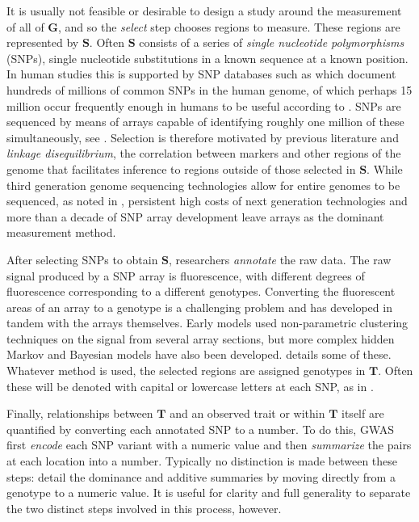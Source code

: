 \documentclass[sts]{imsart}
\newcommand{\m}[1]{\mathbf{#1}}               %
\begin{document}
It is usually not feasible or desirable to design a study around the measurement of all of $\m{G}$, and so the \emph{select} step chooses regions to measure. These regions are represented by $\m{S}$. Often $\m{S}$ consists of a series of \emph{single nucleotide polymorphisms} (SNPs), single nucleotide substitutions in a known sequence at a known position. In human studies this is supported by SNP databases such as \cite{NCBIdbSNP} which document hundreds of millions of common SNPs in the human genome, of which perhaps 15 million occur frequently enough in humans to be useful according to \cite{koboldtetal2013next}. SNPs are sequenced by means of arrays capable of identifying roughly one million of these simultaneously, see \cite{laframboise2009, tametal2019benefits}. Selection is therefore motivated by previous literature and \emph{linkage disequilibrium}, the correlation between markers and other regions of the genome that facilitates inference to regions outside of those selected in $\m{S}$. While third generation genome sequencing technologies allow for entire genomes to be sequenced, as noted in \cite{heatherchain2016sequencers, hasinetal2017multi, uffelmannetal2021gwas}, persistent high costs of next generation technologies and more than a decade of SNP array development leave arrays as the dominant measurement method.

After selecting SNPs to obtain $\m{S}$, researchers \emph{annotate} the raw data. The raw signal produced by a SNP array is fluorescence, with different degrees of fluorescence corresponding to a different genotypes. Converting the fluorescent areas of an array to a genotype is a challenging problem and has developed in tandem with the arrays themselves. Early models used non-parametric clustering techniques on the signal from several array sections, but more complex hidden Markov and Bayesian models have also been developed. \cite{laframboise2009} details some of these. Whatever method is used, the selected regions are assigned genotypes in $\m{T}$. Often these will be denoted with capital or lowercase letters at each SNP, as in \cite{siegmundyakir2007, visschergoddard2019}.

Finally, relationships between $\m{T}$ and an observed trait or within $\m{T}$ itself are quantified by converting each annotated SNP to a number. To do this, GWAS first \emph{encode} each SNP variant with a numeric value and then \emph{summarize} the pairs at each location into a number. Typically no distinction is made between these steps: \cite{LanderBotstein1989, cheverud2001, siegmundyakir2007} detail the dominance and additive summaries by moving directly from a genotype to a numeric value. It is useful for clarity and full generality to separate the two distinct steps involved in this process, however.
\end{document}
